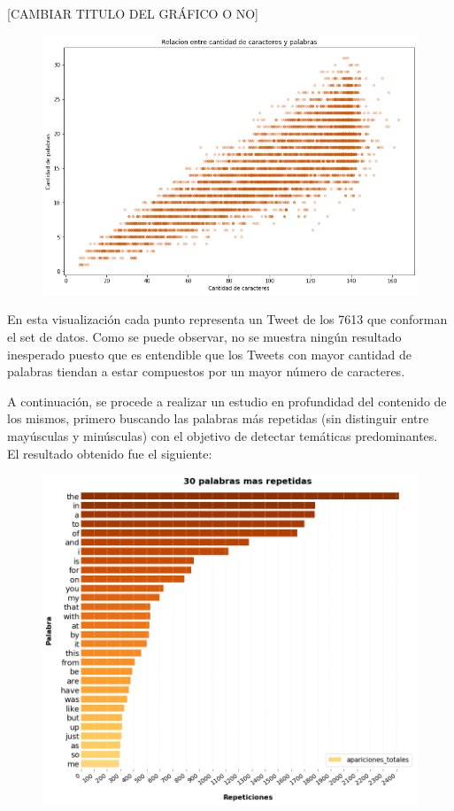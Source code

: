 \documentclass[titlepage,a4paper]{article}
\begin{document}
    [CAMBIAR TITULO DEL GRÁFICO O NO]
    
    \begin{figure}[H]
    \centering
    \includegraphics[width=1\textwidth]{graficos/Analisis Lexico Grafico/relacion_entre_cantidad_caracteres_palabras.png}
    \caption{}  
    \end{figure}
    
    En esta visualización cada punto representa un Tweet de los 7613 que conforman el set de datos. Como se puede observar, no se muestra ningún resultado inesperado puesto que es entendible que los Tweets con mayor cantidad de palabras tiendan a estar compuestos por un mayor número de caracteres.
    
    A continuación, se procede a realizar un estudio en profundidad del contenido de los mismos, primero buscando las palabras más repetidas (sin distinguir entre mayúsculas y minúsculas) con el objetivo de detectar temáticas predominantes. El resultado obtenido fue el siguiente:
    
    \begin{figure}[H]
    \centering
    \includegraphics[width=1\textwidth]{graficos/Analisis Lexico Grafico/top30MasUsadas.png}
    \caption{}  
    \end{figure}
    
\end{document}
